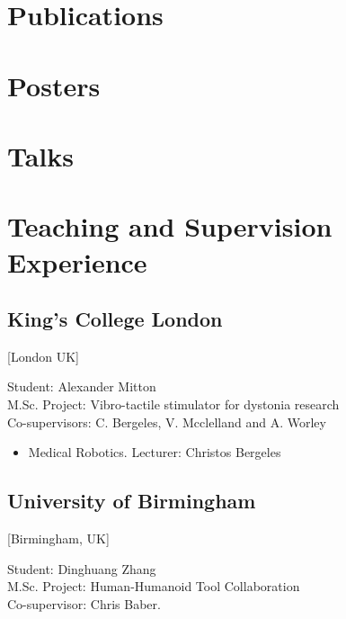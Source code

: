 \documentclass{mycv}
\begin{document}
\section{Publications}

\section{Posters}

\section{Talks}


\section{Teaching and Supervision \\ Experience}
\subsection{King's College London}[London UK]
\begin{positions}
\end{positions}
Student: Alexander Mitton \\
M.Sc. Project: Vibro-tactile stimulator for dystonia research \\
Co-supervisors: C. Bergeles, V. Mcclelland and A. Worley

\begin{positions}
\end{positions}
\begin{itemize}
	\item Medical Robotics. Lecturer: Christos Bergeles
\end{itemize}

\subsection{University of Birmingham}[Birmingham, UK]
\begin{positions}
\end{positions}
Student: Dinghuang Zhang \\
M.Sc. Project: Human-Humanoid Tool Collaboration \\
Co-supervisor: Chris Baber.
\end{document}
